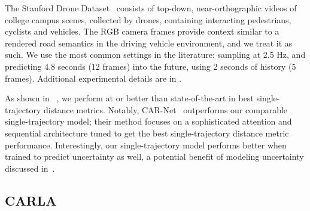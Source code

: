 \documentclass{article}
\newcommand{\supsecref}[1]{\secref{#1}}
\begin{document}
The Stanford Drone Dataset~\cite{Robicquet16} consists of top-down, near-orthographic videos of college campus scenes, collected by drones, containing interacting pedestrians, cyclists and vehicles.  The RGB camera frames provide context similar to a rendered road semantics in the driving vehicle environment, and we treat it as such.  We use the most common settings in the literature: sampling at 2.5 Hz, and predicting 4.8 seconds (12 frames) into the future, using 2 seconds of history (5 frames).  Additional experimental details are in \supsecref{sec:sdd_experiment_setup}.

As shown in ~, we perform at or better than state-of-the-art in best single-trajectory distance metrics.  Notably, CAR-Net~\cite{Sadeghian18} outperforms our comparable single-trajectory model; their method focuses on a sophisticated attention and sequential architecture tuned to get the best single-trajectory distance metric performance.  Interestingly, our single-trajectory model performs better when trained to predict uncertainty as well, a potential benefit of modeling uncertainty discussed in~\cite{Kendall17}.  

\subsection{CARLA}
\label{sec:carla}

\end{document}
